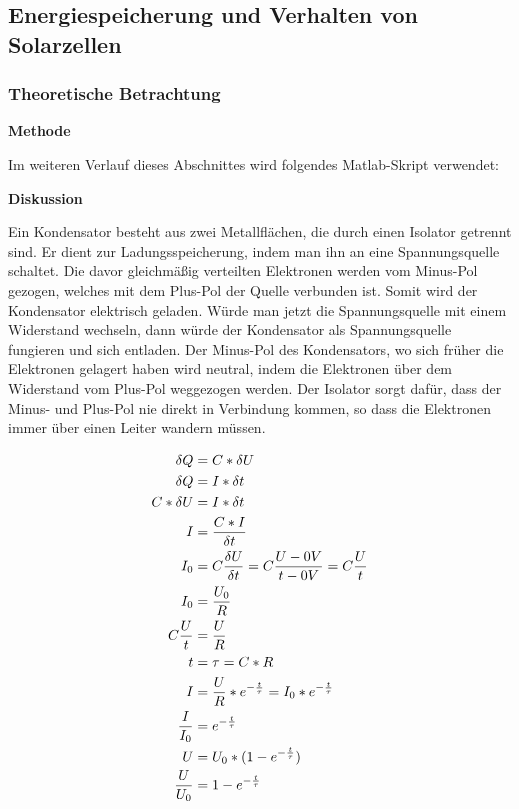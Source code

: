 \subsection {Energiespeicherung und Verhalten von Solarzellen}      %
    \subsubsection{Theoretische Betrachtung}                            %
        \textbf{Methode}
        \newline
        \par
        Im weiteren Verlauf dieses Abschnittes wird folgendes Matlab-Skript verwendet:
        \newline
        
        \textbf{Diskussion}
        \newline
        \par Ein Kondensator besteht aus zwei Metallflächen, die durch einen Isolator getrennt sind. Er dient zur Ladungsspeicherung, indem man ihn an eine Spannungsquelle schaltet. Die davor gleichmäßig verteilten Elektronen werden vom Minus-Pol gezogen, welches mit dem Plus-Pol der Quelle verbunden ist. Somit wird der Kondensator elektrisch geladen. Würde man jetzt die Spannungsquelle mit einem Widerstand wechseln, dann würde der Kondensator als Spannungsquelle fungieren und sich entladen. Der Minus-Pol des Kondensators, wo sich früher die Elektronen gelagert haben wird neutral, indem die Elektronen über dem Widerstand vom Plus-Pol weggezogen werden. Der Isolator sorgt dafür, dass der Minus- und Plus-Pol nie direkt in Verbindung kommen, so dass die Elektronen immer über einen Leiter wandern müssen.
        
        \begin{align}
            \delta Q &= C * \delta U \\
            \delta Q &= I * \delta t \\
            C * \delta U &= I * \delta t \\
            I &= \frac{C * I}{\delta t} \\
            I_0 &= C \frac{\delta U}{\delta t} = C \frac{U - 0V}{t - 0V}=C\frac{U}{t} \\
            I_0 &= \frac{U_0}{R} \\
            C\frac{U}{t} &= \frac{U}{R} \\
            t &= \tau = C*R \\
            I &= \frac{U}{R} * e\textsuperscript{$-\frac{t}{\tau}$} = I_0 * e^{-\frac{t}{\tau}} \\
            \frac{I}{I_0} &= e^{-\frac{t}{\tau}} \\
            U &= U_0 * (1 - e^{-\frac{t}{\tau}}) \\
            \frac{U}{U_0} &= 1 - e^{-\frac{t}{\tau}}
        \end{align}
        
